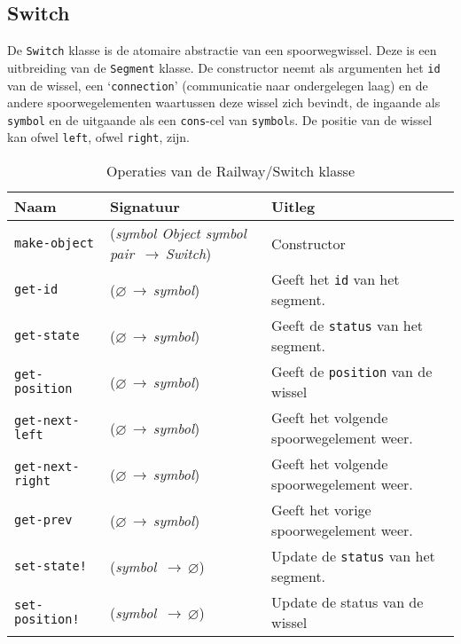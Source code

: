 \documentclass[a4paper, 11pt]{article}
\newcommand{\naar}{\,$\rightarrow$\,}
\renewcommand{\empty}{$\varnothing$}
\newcommand{\<}{\scriptsize\textless\normalsize}
\renewcommand{\>}{\scriptsize\textgreater\normalsize}
\begin{document}
\subsection{Switch} %
De \texttt{Switch} klasse is de atomaire abstractie van een spoorwegwissel. Deze is een uitbreiding van de \texttt{Segment} klasse. De constructor neemt als argumenten het \texttt{id} van de wissel, een \lq\texttt{connection}' (communicatie naar ondergelegen laag) en de andere spoorwegelementen waartussen deze wissel zich bevindt, de ingaande als \texttt{symbol} en de uitgaande als een \texttt{cons}-cel van \texttt{symbol}s. De positie van de wissel kan ofwel \texttt{left}, ofwel \texttt{right}, zijn.
\begin{table}[H]
	\begin{center}
		{
		\begin{tabular}{|l l l|}
			\hline
			\textbf{Naam} & \textbf{Signatuur} & \textbf{Uitleg}\\
			\hline
			\texttt{make-object} & (\textit{symbol Object symbol pair} \naar \textit{Switch}) & Constructor\\
			\hline
			\texttt{get-id} & (\empty \naar \textit{symbol}) & Geeft het \texttt{id} van het segment.\\
			\texttt{get-state} & (\empty \naar \textit{symbol}) & Geeft de \texttt{status} van het segment.\\
			\texttt{get-position} & (\empty \naar \textit{symbol}) & Geeft de \texttt{position} van de wissel\\
			\texttt{get-next-left} & (\empty \naar \textit{symbol}) & Geeft het volgende spoorwegelement weer.\\
			\texttt{get-next-right} & (\empty \naar \textit{symbol}) & Geeft het volgende spoorwegelement weer.\\
			\texttt{get-prev} & (\empty \naar \textit{symbol}) & Geeft het vorige spoorwegelement weer.\\
			\texttt{set-state!} & (\textit{symbol} \naar \empty) & Update de \texttt{status} van het segment.\\
			
			\texttt{set-position!} & (\textit{symbol} \naar \empty) & Update de status van de wissel\\
			\hline
		\end{tabular}}
		\caption{Operaties van de Railway/Switch klasse}
	\end{center}
\end{table}
\end{document}
